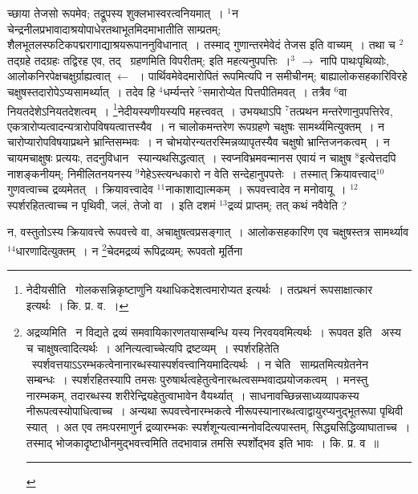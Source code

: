 \documentclass[11pt, openany]{book}
\begin{document}
\newpage
\noindent
च्छाया तेजसो रूपमेव; तद्रूपस्य शुक्लभास्वरत्वनियमात्~। ${}^1$न चेन्द्रनीलप्रभावादाश्रयोपाधेरतथाभूतमिदमाभातीति साम्प्रतम्; शैलभूतलस्फटिकपद्मरागाद्याश्रयरूपाननुविधानात्~। तस्माद् गुणान्तरमेवेदं तेजस इति वाच्यम्~। तथा च ${}^2$तद्ग्रहे तदग्रहः तद्विरह एव, तद्  \textendash\ ग्रहणमिति विपरीतम्; इति महत्यनुपपत्तिः~।$^3$ $\rightarrow$ नापि पाथःपृथिव्योः, आलोकनिरपेक्षचक्षुर्ग्राह्यत्वात् $\leftarrow$~। पार्थिवमेवेदमारोपितं रूपमित्यपि न समीचीनम्; बाह्यालोकसहकारिविरहे चक्षुषस्तदारोपेऽप्यसामर्थ्यात्~। तदेव हि ${}^4$धर्म्यन्तरे ${}^5$समारोप्येत पित्तपीतिमवत्~। तत्रैव ${}^6$वा नियतदेशेऽनियतदेशत्वम्~। \renewcommand{\thefootnote}{१}\footnote{नेदीयसीति \textendash\ गोलकसन्निकृष्टाणुनि यथाधिकदेशत्वमारोप्यत इत्यर्थः~। तत्प्रथनं रूपसाक्षात्कार इत्यर्थः~। कि. प्र. व.~।}नेदीयस्यणीयस्यपि महत्त्ववत्~। उभयथाऽपि ${}^7$तत्प्रथन मन्तरेणानुपपत्तिरेव, एकत्रारोप्यत्वादन्यत्रारोपविषयत्वात्तस्यैव~। न चालोकमन्तरेण रूपग्रहणे चक्षुषः सामर्थ्यमित्युक्तम्~। न चारोप्यारोपविषयाप्रथने भ्रान्तिसम्भवः~। न चोभयोरन्यतरस्मिन्नव्यापृतस्यैव चक्षुषो भ्रान्तिजनकत्वम्~। न चायमचाक्षुषः प्रत्ययः, तदनुविधान \textendash\ स्यान्यथसिद्धत्वात्~। स्वप्नविभ्रमवन्मानस एवायं न चाक्षुष ${}^8$इत्येत्तदपि नाशङ्कनीयम्; निमीलितनयनस्य ${}^9$गेहेऽस्त्यन्धकारो न वेति सन्देहानुपपत्तेः~। तस्मात् क्रियावत्त्वाद्${}^10$गुणवत्वाच्च द्रव्यमेतत्~। क्रियावत्त्वादेव ${}^11$नाकाशाद्यात्मकम्~। रूपवत्त्वादेव न मनोवायू~। ${}^12$स्पर्शरहितत्वाच्च न पृथिवी, जलं, तेजो वा~। इति दशमं ${}^13$द्रव्यं प्राप्तम्; तत् कथं नवैवेति ?

न, वस्तुतोऽस्य क्रियावत्त्वे रूपवत्त्वे वा, अचाक्षुषत्वप्रसङ्गात्~। आलोकसहकारिण एव चक्षुषस्तत्र सामर्थ्याव$^14$धारणादित्युक्तम्~। न \renewcommand{\thefootnote}{२}\footnote{अद्रव्यमिति \textendash\ न विद्यते द्रव्यं समवायिकारणतयासम्बन्धि यस्य निरवयवमित्यर्थः~। रूपवत इति \textendash\ अस्य च चाक्षुषत्वादित्यर्थः~। अनित्यत्वाच्चेत्यपि द्रष्टव्यम्~। स्पर्शरहितेति \textendash\ स्पर्शवत्तयाऽऽरम्भकत्वेनानारब्धस्यास्पर्शवत्त्वानियमादित्यर्थः~। न चेति \textendash\ साम्प्रतमित्यग्रेतनेन सम्बन्धः~। स्पर्शरहितस्यापि तमसः पुरुषार्थत्वहेतुत्वेनारब्धत्वसम्भवादप्रयोजकत्वम्~। मनस्तु नारम्भकम्, तदारब्धस्य शरीरेन्द्रियहेतुत्वाभावेन वैयर्थ्यात्~। साधनावच्छिन्नसाध्यव्यापकस्य नीरूपत्वस्योपाधित्वाच्च~। अन्यथा रूपवत्त्वेनारम्भकत्वे नीरूपस्यानारब्धत्वाद्वायुरप्यनुद्भूतरूपा पृथिवी स्यात्~। अत एव तमःपरमाणुर्न द्रव्यारम्भकः स्पर्शशून्यत्वान्मनोवदित्यपास्तम्, सिद्ध्यसिद्धिव्याघाताच्च~। तस्माद् भोजकादृष्टाधीनमुद्भवत्त्वमिति तदभावान्न तमसि स्पर्शोद्भव इति भावः~। कि. प्र. व~॥ \rule{0.4\linewidth}{0.5pt}}चेदमद्रव्यं रूपिद्रव्यम्; रूपवतो मूर्तिना\textendash
\end{document}
